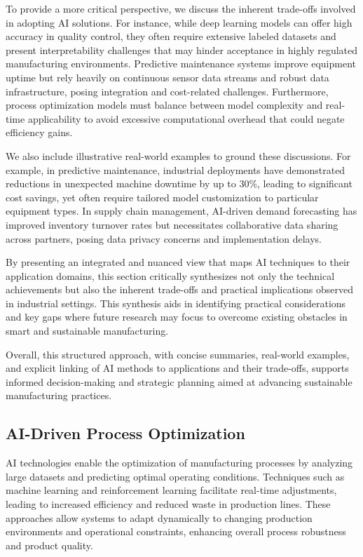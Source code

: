 \documentclass[sigconf]{acmart}
\begin{document}
To provide a more critical perspective, we discuss the inherent trade-offs involved in adopting AI solutions. For instance, while deep learning models can offer high accuracy in quality control, they often require extensive labeled datasets and present interpretability challenges that may hinder acceptance in highly regulated manufacturing environments. Predictive maintenance systems improve equipment uptime but rely heavily on continuous sensor data streams and robust data infrastructure, posing integration and cost-related challenges. Furthermore, process optimization models must balance between model complexity and real-time applicability to avoid excessive computational overhead that could negate efficiency gains.

We also include illustrative real-world examples to ground these discussions. For example, in predictive maintenance, industrial deployments have demonstrated reductions in unexpected machine downtime by up to 30\%, leading to significant cost savings, yet often require tailored model customization to particular equipment types. In supply chain management, AI-driven demand forecasting has improved inventory turnover rates but necessitates collaborative data sharing across partners, posing data privacy concerns and implementation delays.

By presenting an integrated and nuanced view that maps AI techniques to their application domains, this section critically synthesizes not only the technical achievements but also the inherent trade-offs and practical implications observed in industrial settings. This synthesis aids in identifying practical considerations and key gaps where future research may focus to overcome existing obstacles in smart and sustainable manufacturing.

Overall, this structured approach, with concise summaries, real-world examples, and explicit linking of AI methods to applications and their trade-offs, supports informed decision-making and strategic planning aimed at advancing sustainable manufacturing practices.

\subsection{AI-Driven Process Optimization}
AI technologies enable the optimization of manufacturing processes by analyzing large datasets and predicting optimal operating conditions. Techniques such as machine learning and reinforcement learning facilitate real-time adjustments, leading to increased efficiency and reduced waste in production lines. These approaches allow systems to adapt dynamically to changing production environments and operational constraints, enhancing overall process robustness and product quality.
\end{document}
